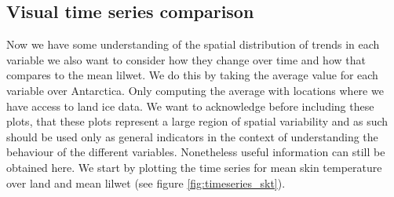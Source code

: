 \documentclass[../main.tex]{subfiles}
\begin{document}

\subsection{Visual time series comparison}
Now we have some understanding of the spatial distribution of trends in each variable we also want to consider how they change over time and how that compares to the mean \gls{lilwet}. We do this by taking the average value for each variable over Antarctica. Only computing the average with locations where we have access to land ice data. We want to acknowledge before including these plots, that these plots represent a large region of spatial variability and as such should be used only as general indicators in the context of understanding the behaviour of the different variables. Nonetheless useful information can still be obtained here. We start by plotting the time series for mean skin temperature over land and mean \gls{lilwet} (see figure \ref{fig:timeseries_skt}).
\end{document}
